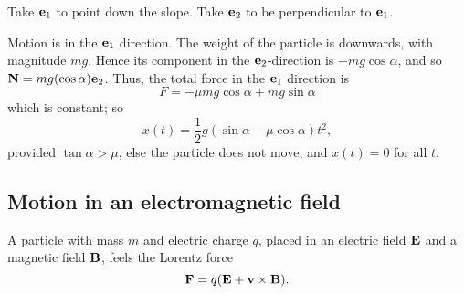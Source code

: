 \documentclass[10pt, a4paper]{article}
\begin{document}
\begin{solution}
    Take $\mathbf{e}_1$ to point down the slope.
    Take $\mathbf{e}_2$ to be perpendicular to $\mathbf{e}_1$.

    Motion is in the $\mathbf{e}_1$ direction.
    The weight of the particle is downwards,
    with magnitude $mg$.
    Hence its component in the $\mathbf{e}_2$-direction is $-mg\cos{\alpha}$,
    and so $\mathbf{N} = mg(\cos{\alpha})\mathbf{e}_2$.
    Thus,
    the total force in the $\mathbf{e}_1$ direction is
    \[
    F = -\mu mg\cos{\alpha} + mg\sin{\alpha}
    \]
    which is constant;
    so
    \[
    x(t) = \frac{1}{2}g(\sin{\alpha} - \mu\cos{\alpha})t ^ 2,
    \]
    provided $\tan{\alpha} > \mu$,
    else the particle does not move,
    and $x(t) = 0$ for all $t$.
\end{solution}

\subsection{Motion in an electromagnetic field}

A particle with mass $m$ and electric charge $q$,
placed in an electric field $\mathbf{E}$ and a magnetic field $\mathbf{B}$,
feels the Lorentz force
\[
\mathbf{F} = q(\mathbf{E} + \mathbf{v} \times \mathbf{B}).
\]
\end{document}
